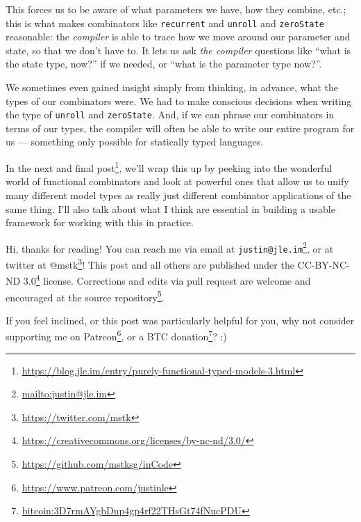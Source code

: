 \documentclass[]{article}
\renewcommand{\href}[2]{#2\footnote{\url{#1}}}
\begin{document}
\begin{enumerate}
  This forces us to be aware of what parameters we have, how they combine, etc.;
  this is what makes combinators like \texttt{recurrent} and \texttt{unroll} and
  \texttt{zeroState} reasonable: the \emph{compiler} is able to trace how we
  move around our parameter and state, so that we don't have to. It lets us ask
  \emph{the compiler} questions like ``what is the state type, now?'' if we
  needed, or ``what is the parameter type now?''.

  We sometimes even gained insight simply from thinking, in advance, what the
  types of our combinators were. We had to make conscious decisions when writing
  the type of \texttt{unroll} and \texttt{zeroState}. And, if we can phrase our
  combinators in terms of our types, the compiler will often be able to write
  our entire program for us --- something only possible for statically typed
  languages.
\end{enumerate}

In the
\href{https://blog.jle.im/entry/purely-functional-typed-models-3.html}{next and
final post}, we'll wrap this up by peeking into the wonderful world of
functional combinators and look at powerful ones that allow us to unify many
different model types as really just different combinator applications of the
same thing. I'll also talk about what I think are essential in building a usable
framework for working with this in practice.

Hi, thanks for reading! You can reach me via email at
\href{mailto:justin@jle.im}{\nolinkurl{justin@jle.im}}, or at twitter at
\href{https://twitter.com/mstk}{@mstk}! This post and all others are published
under the \href{https://creativecommons.org/licenses/by-nc-nd/3.0/}{CC-BY-NC-ND
3.0} license. Corrections and edits via pull request are welcome and encouraged
at \href{https://github.com/mstksg/inCode}{the source repository}.

If you feel inclined, or this post was particularly helpful for you, why not
consider \href{https://www.patreon.com/justinle}{supporting me on Patreon}, or a
\href{bitcoin:3D7rmAYgbDnp4gp4rf22THsGt74fNucPDU}{BTC donation}? :)
\end{document}
